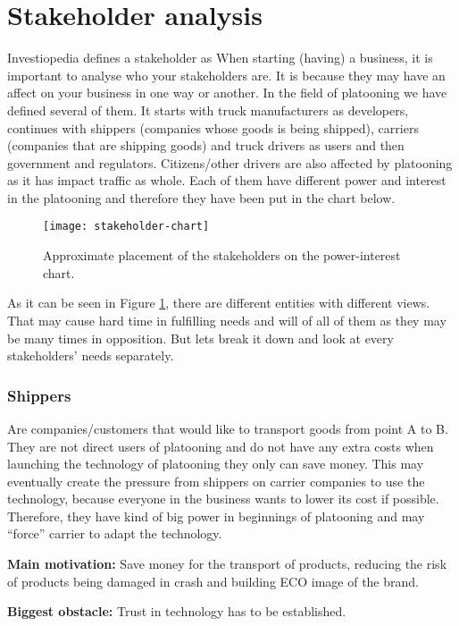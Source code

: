 \section{Stakeholder analysis}\label{sec:stakeholders}

Investiopedia defines a stakeholder as 
% 
% 
When starting (having) a business, it is important to analyse who your stakeholders are. It is because they may have an affect on your business in one way or another. In the field of platooning we have defined several of them. It starts with truck manufacturers as developers, continues with shippers (companies whose goods is being shipped), carriers (companies that are shipping goods) and truck drivers as users and then government and regulators. Citizens/other drivers are also affected by platooning as it has impact traffic as whole. Each of them have different power and interest in the platooning and therefore they have been put in the chart below.\par
% 
\begin{figure}[h]
    \centering
    \texttt{[image: stakeholder-chart]}
    \caption{Approximate placement of the stakeholders on the power-interest chart.}
    \label{fig:stakeholder-chart}
\end{figure}
% 
As it can be seen in Figure \ref{fig:stakeholder-chart}, there are different entities with different views. That may cause hard time in fulfilling needs and will of all of them as they may be many times in opposition. But lets break it down and look at every stakeholders’ needs separately.\par
% 
\subsubsection*{Shippers}
Are companies/customers that would like to transport goods from point A to B. They are not direct users of platooning and do not have any extra costs when launching the technology of platooning they only can save money. This may eventually create the pressure from shippers on carrier companies to use the technology, because everyone in the business wants to lower its cost if possible. Therefore, they have kind of big power in beginnings of platooning and may “force” carrier to adapt the technology.
% 
% 
\par \textbf{Main motivation:} Save money for the transport of products, reducing the risk of products being damaged in crash and building ECO image of the brand.
%
\par \textbf{Biggest obstacle:} Trust in technology has to be established.
% 
% 
